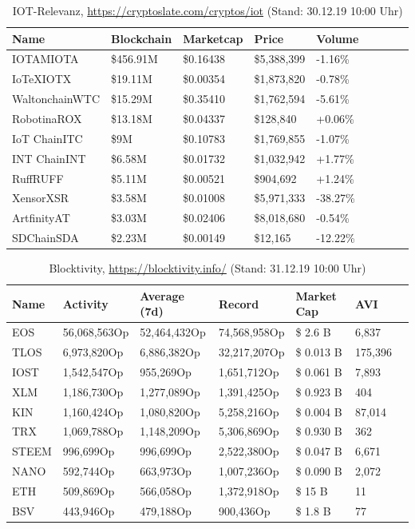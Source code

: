 \begin{table}[]
\caption[IOT-Relevanz]{IOT-Relevanz, \url{https://cryptoslate.com/cryptos/iot} (Stand: 30.12.19 10:00 Uhr)}
\label{tab:_iot}
\centering
\begin{tabular}{@{}lllllllll@{}}
\toprule
\textbf{Name} & \textbf{Blockchain} & \textbf{Marketcap} & \textbf{Price} & \textbf{Volume} \\ \midrule
IOTAMIOTA & \$456.91M & \$0.16438 & \$5,388,399 & -1.16\% \\
IoTeXIOTX & \$19.11M & \$0.00354 & \$1,873,820 & -0.78\% \\
WaltonchainWTC & \$15.29M & \$0.35410 & \$1,762,594 & -5.61\% \\
RobotinaROX & \$13.18M & \$0.04337 & \$128,840 & +0.06\% \\
IoT ChainITC & \$9M & \$0.10783 & \$1,769,855 & -1.07\% \\
INT ChainINT & \$6.58M & \$0.01732 & \$1,032,942 & +1.77\% \\
RuffRUFF & \$5.11M & \$0.00521 & \$904,692 & +1.24\% \\
XensorXSR & \$3.58M & \$0.01008 & \$5,971,333 & -38.27\% \\
ArtfinityAT & \$3.03M & \$0.02406 & \$8,018,680 & -0.54\% \\
SDChainSDA & \$2.23M & \$0.00149 & \$12,165 & -12.22\% \\ \bottomrule
\end{tabular}
\end{table}



\begin{table}[]
\caption[Blocktivity]{Blocktivity, \url{https://blocktivity.info/} (Stand: 31.12.19 10:00 Uhr)}
\label{tab:_blocktivity}
\centering
\begin{tabular}{@{}lllllll@{}}
\toprule
\textbf{Name} & \textbf{Activity} & \textbf{Average (7d)} & \textbf{Record} & \textbf{Market Cap} & \textbf{AVI} \\ \midrule
EOS & 56,068,563Op & 52,464,432Op & 74,568,958Op & \$ 2.6 B & 6,837 \\
TLOS & 6,973,820Op & 6,886,382Op & 32,217,207Op & \$ 0.013 B & 175,396 \\
IOST & 1,542,547Op & 955,269Op & 1,651,712Op & \$ 0.061 B & 7,893 \\
XLM & 1,186,730Op & 1,277,089Op & 1,391,425Op & \$ 0.923 B & 404 \\
KIN & 1,160,424Op & 1,080,820Op & 5,258,216Op & \$ 0.004 B & 87,014 \\
TRX & 1,069,788Op & 1,148,209Op & 5,306,869Op & \$ 0.930 B & 362 \\
STEEM & 996,699Op & 996,699Op & 2,522,380Op & \$ 0.047 B & 6,671 \\
NANO & 592,744Op & 663,973Op & 1,007,236Op & \$ 0.090 B & 2,072 \\
ETH & 509,869Op & 566,058Op & 1,372,918Op & \$ 15 B & 11 \\
BSV & 443,946Op & 479,188Op & 900,436Op & \$ 1.8 B & 77 \\ \bottomrule
\end{tabular}
\end{table}



